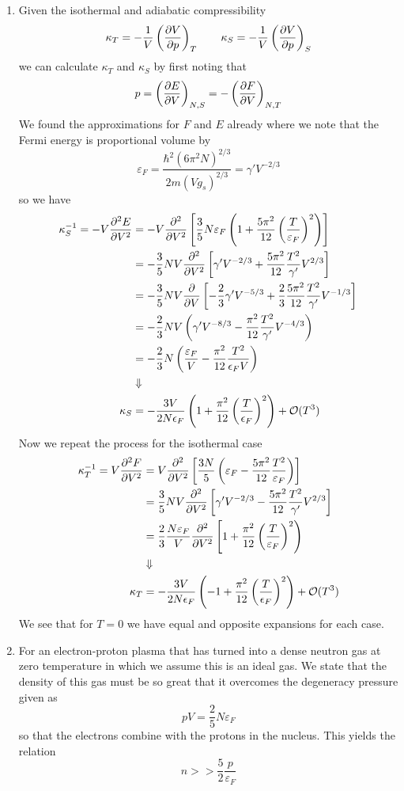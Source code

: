 \documentclass[11pt]{article}
\numberwithin{equation}{section}
\begin{document}
\begin{enumerate}[(1)]
\item Given the isothermal and adiabatic compressibility
$$\kappa_T = -\frac{1}{V}\left(\frac{\partial{V}}{\partial{p}}\right)_T\qquad\kappa_S = -\frac{1}{V}\left(\frac{\partial{V}}{\partial{p}}\right)_S$$
we can calculate $\kappa_T$ and $\kappa_S$ by first noting that 
$$p = \left(\frac{\partial{E}}{\partial{V}}\right)_{N,S} = -\left(\frac{\partial{F}}{\partial{V}}\right)_{N,T}$$
We found the approximations for $F$ and $E$ already where we note that the Fermi energy is
proportional volume by
$$\varepsilon_F = \frac{\hbar^2(6\pi^2N)^{2/3}}{2m(Vg_s)^{2/3}} = \gamma'V^{-2/3}$$
so we have
\begin{align*}
\kappa_S^{-1} = -V\frac{\partial{^2E}}{\partial{V^2}} &= -V\frac{\partial{^2}}{\partial{V^2}}\left[\frac{3}{5}N\varepsilon_F\left(1 + \frac{5\pi^2}{12}\left(\frac{T}{\varepsilon_F}\right)^2\right)\right]\\
&= -\frac{3}{5}NV\frac{\partial{^2}}{\partial{V^2}}\left[\gamma'V^{-2/3} + \frac{5\pi^2}{12}\frac{T^2}{\gamma'}V^{2/3}\right]\\
&= -\frac{3}{5}NV\frac{\partial{}}{\partial{V}}\left[-\frac{2}{3}\gamma'V^{-5/3} + \frac{2}{3}\frac{5\pi^2}{12}\frac{T^2}{\gamma'}V^{-1/3}\right]\\
&= -\frac{2}{3}NV\left(\gamma'V^{-8/3} - \frac{\pi^2}{12}\frac{T^2}{\gamma'}V^{-4/3}\right)\\
&= -\frac{2}{3}N\left(\frac{\varepsilon_F}{V} - \frac{\pi^2}{12}\frac{T^2}{\epsilon_FV}\right)\\
&\Downarrow\\
\kappa_S &= -\frac{3V}{2N\epsilon_F}\left(1 + \frac{\pi^2}{12}\left(\frac{T}{\epsilon_F}\right)^2\right) +\mathcal{O}(T^3)
\end{align*}
Now we repeat the process for the isothermal case
\begin{align*}
\kappa_T^{-1} = V\frac{\partial{^2F}}{\partial{V^2}} &= V\frac{\partial{^2}}{\partial{V^2}}\left[\frac{3N}{5}\left(\varepsilon_F - \frac{5\pi^2}{12}\frac{T^2}{\varepsilon_F}\right)\right]\\
&= \frac{3}{5}NV\frac{\partial{^2}}{\partial{V^2}}\left[\gamma'V^{-2/3} - \frac{5\pi^2}{12}\frac{T^2}{\gamma'}V^{2/3}\right]\\
&= \frac{2}{3}\frac{N\varepsilon_F}{V}\frac{\partial{^2}}{\partial{V^2}}\left[1 + \frac{\pi^2}{12}\left(\frac{T}{\varepsilon_F}\right)^2\right)\\
&\Downarrow\\
\kappa_T &= -\frac{3V}{2N\epsilon_F}\left(-1 + \frac{\pi^2}{12}\left(\frac{T}{\epsilon_F}\right)^2\right) +\mathcal{O}(T^3)
\end{align*}
We see that for $T=0$ we have equal and opposite expansions for each case.

\item For an electron-proton plasma that has turned into a dense neutron gas at zero 
temperature in which we assume this is an ideal gas. We state that the density of this gas
must be so great that it overcomes the degeneracy pressure given as
$$pV = \frac{2}{5}N\varepsilon_F$$
so that the electrons combine with the protons in the nucleus. This yields the relation
$$n>>\frac{5}{2}\frac{p}{\varepsilon_F}$$
\end{enumerate}
\end{document}
